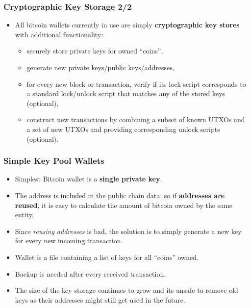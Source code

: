 \documentclass{beamer}
\begin{document}
\begin{frame}
  \frametitle{Cryptographic Key Storage 2/2}
  \begin{itemize}
  \item All bitcoin wallets currently in use are simply \textbf{cryptographic
      key stores} with additional functionality:
    \begin{itemize}
    \item securely store private keys for owned ``coins'',
    \item generate new private keys/public keys/addresses,
    \item for every new block or transaction, verify if its lock script
      corresponds to a standard lock/unlock script that matches any of the
      stored keys (optional),
    \item construct new transactions by combining a subset of known UTXOs and a
      set of new UTXOs and providing corresponding unlock scripts (optional).
    \end{itemize}
  \end{itemize}
\end{frame}

\begin{frame}
  \frametitle{Simple Key Pool Wallets}
  \begin{itemize}
  \item Simplest Bitcoin wallet is a \textbf{single private key}.
  \item The address is included in the public chain data, so if
    \textbf{addresses are reused}, it is easy to calculate the amount of bitcoin
    owned by the same entity.
  \item Since \textit{reusing addresses} is bad, the solution is to simply
    generate a new key for every new incoming transaction.
  \item Wallet is a file containing a list of keys for all ``coins'' owned.
  \item Backup is needed after every received transaction.
  \item The size of the key storage continues to grow and its unsafe to remove
    old keys as their addresses might still get used in the future.
  \end{itemize}
\end{frame}
\end{document}
